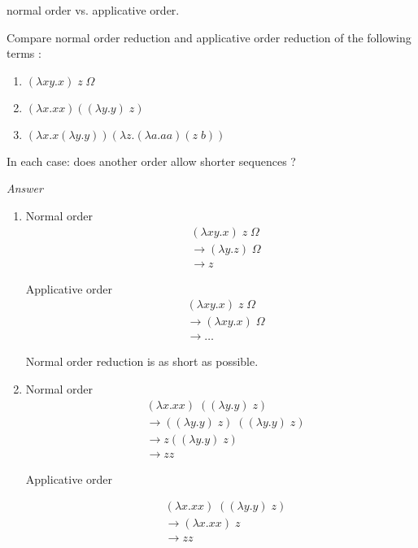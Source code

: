 \documentclass{article}
\theoremstyle{plain}
\theoremstyle{plain}
\begin{document}
  \exo normal order vs. applicative order.

  Compare normal order reduction and applicative order reduction of the
  following terms :

  \begin{enumerate}
    \item $(\lambda xy.x)\;z\;\Omega$
    \item $(\lambda x.xx)((\lambda y.y)\;z)$
    \item $(\lambda x.x(\lambda y.y)) (\lambda z.(\lambda a.aa)(z\;b))$
  \end{enumerate}

  In each case: does another order allow shorter sequences ?

  \textit{Answer}

  \begin{enumerate}
    \item Normal order
      \begin{align*}
        &(\lambda xy.x)\;z\;\Omega\\
        &\to (\lambda y.z)\; \Omega\\
        &\to z
      \end{align*}

      Applicative order
      \begin{align*}
        &(\lambda xy.x)\;z\;\Omega\\
        &\to (\lambda xy.x)\; \Omega\\
        &\to \ldots
      \end{align*}

      Normal order reduction is as short as possible.

    \item Normal order
      \begin{align*}
        &(\lambda x.xx)\;((\lambda y.y)\;z) \\
        &\to ((\lambda y.y)\; z)\;((\lambda y.y)\;z) \\
        &\to z ((\lambda y.y)\;z) \\
        &\to zz
      \end{align*}

      Applicative order

      \begin{align*}
        &(\lambda x.xx)\;((\lambda y.y)\;z) \\
        &\to (\lambda x.xx)\;z \\
        &\to zz
      \end{align*}


\end{enumerate}
\end{document}
